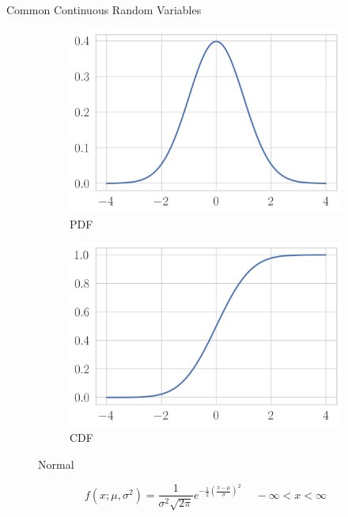 \documentclass[11pt, xcolor={dvipsnames}, hyperref={colorlinks, allcolors=Blue}]{beamer}
\begin{document}
\begin{frame}{Common Continuous Random Variables}
\begin{figure}[t]
	\begin{subfigure}[b]{0.4\textwidth}
		\centering
		\includegraphics[width=\textwidth]{normal_pdf.png}
		\caption*{PDF}
	\end{subfigure}
	\begin{subfigure}[b]{0.4\textwidth}
		\centering
		\includegraphics[width=\textwidth]{normal_cdf.png}
		\caption*{CDF}
	\end{subfigure}
\caption{Normal}
\end{figure}

\[ f(x; \mu, \sigma^{2}) = \frac{1}{\sigma^{2}\sqrt{2\pi}} e^{-\frac{1}{2} \left(\frac{x - \mu}{\sigma}\right)^{2}} \quad \ -\infty < x < \infty \]


\end{frame}
\end{document}
